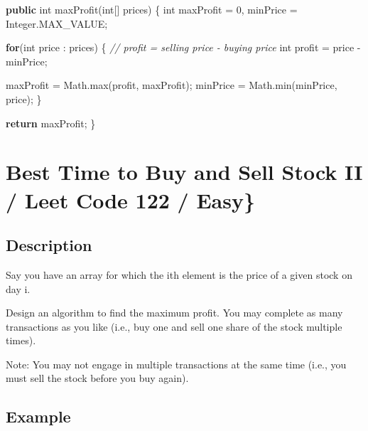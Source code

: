 \documentclass[]{book}
\newenvironment{Shaded}{\begin{snugshade}}{\end{snugshade}}
\newcommand{\BuiltInTok}[1]{#1}
\newcommand{\CommentTok}[1]{\textcolor[rgb]{0.56,0.35,0.01}{\textit{#1}}}
\newcommand{\DataTypeTok}[1]{\textcolor[rgb]{0.13,0.29,0.53}{#1}}
\newcommand{\DecValTok}[1]{\textcolor[rgb]{0.00,0.00,0.81}{#1}}
\newcommand{\FunctionTok}[1]{\textcolor[rgb]{0.00,0.00,0.00}{#1}}
\newcommand{\KeywordTok}[1]{\textcolor[rgb]{0.13,0.29,0.53}{\textbf{#1}}}
\newcommand{\NormalTok}[1]{#1}
\begin{document}
\begin{Shaded}
\begin{Highlighting}[]
\KeywordTok{public} \DataTypeTok{int} \FunctionTok{maxProfit}\NormalTok{(}\DataTypeTok{int}\NormalTok{[] prices) \{}
    \DataTypeTok{int}\NormalTok{ maxProfit = }\DecValTok{0}\NormalTok{, minPrice = }\BuiltInTok{Integer}\NormalTok{.}\FunctionTok{MAX_VALUE}\NormalTok{;}

    \KeywordTok{for}\NormalTok{(}\DataTypeTok{int}\NormalTok{ price : prices) \{}
        \CommentTok{// profit = selling price - buying price}
        \DataTypeTok{int}\NormalTok{ profit = price - minPrice;}

\NormalTok{        maxProfit = }\BuiltInTok{Math}\NormalTok{.}\FunctionTok{max}\NormalTok{(profit, maxProfit);}
\NormalTok{        minPrice = }\BuiltInTok{Math}\NormalTok{.}\FunctionTok{min}\NormalTok{(minPrice, price);}
\NormalTok{    \}}

    \KeywordTok{return}\NormalTok{ maxProfit;}
\NormalTok{\}}
\end{Highlighting}
\end{Shaded}

\hypertarget{best-time-to-buy-and-sell-stock-ii-leet-code-122-easy}{%
\section{Best Time to Buy and Sell Stock II / Leet Code 122 / Easy\}}\label{best-time-to-buy-and-sell-stock-ii-leet-code-122-easy}}

\hypertarget{description-35}{%
\subsection{Description}\label{description-35}}

Say you have an array for which the ith element is the price of a given stock on day i.

Design an algorithm to find the maximum profit. You may complete as many transactions as you like (i.e., buy one and
sell one share of the stock multiple times).

Note: You may not engage in multiple transactions at the same time (i.e., you must sell the stock before you buy
again).

\hypertarget{example-34}{%
\subsection{Example}\label{example-34}}
\end{document}
